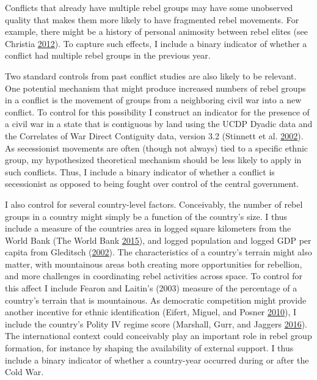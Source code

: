 \documentclass[12pt,]{book}
\theoremstyle{definition}
\theoremstyle{definition}
\theoremstyle{remark}
\begin{document}
Conflicts that already have multiple rebel groups may have some
unobserved quality that makes them more likely to have fragmented rebel
movements. For example, there might be a history of personal animosity
between rebel elites (see Christia
\protect\hyperlink{ref-Christia2012}{2012}). To capture such effects, I
include a binary indicator of whether a conflict had multiple rebel
groups in the previous year.

Two standard controls from past conflict studies are also likely to be
relevant. One potential mechanism that might produce increased numbers
of rebel groups in a conflict is the movement of groups from a
neighboring civil war into a new conflict. To control for this
possibility I construct an indicator for the presence of a civil war in
a state that is contiguous by land using the UCDP Dyadic data and the
Correlates of War Direct Contiguity data, version 3.2 (Stinnett et al.
\protect\hyperlink{ref-Stinnett2002a}{2002}). As secessionist movements
are often (though not always) tied to a specific ethnic group, my
hypothesized theoretical mechanism should be less likely to apply in
such conflicts. Thus, I include a binary indicator of whether a conflict
is secessionist as opposed to being fought over control of the central
government.

I also control for several country-level factors. Conceivably, the
number of rebel groups in a country might simply be a function of the
country's size. I thus include a measure of the countries area in logged
square kilometers from the World Bank (The World Bank
\protect\hyperlink{ref-WorldBank2015}{2015}), and logged population and
logged GDP per capita from Gleditsch
(\protect\hyperlink{ref-Gleditsch2002b}{2002}). The characteristics of a
country's terrain might also matter, with mountainous areas both
creating more opportunities for rebellion, and more challenges in
coordinating rebel activities across space. To control for this affect I
include Fearon and Laitin's (2003) measure of the percentage of a
country's terrain that is mountainous. As democratic competition might
provide another incentive for ethnic identification (Eifert, Miguel, and
Posner \protect\hyperlink{ref-Eifert2010}{2010}), I include the
country's Polity IV regime score (Marshall, Gurr, and Jaggers
\protect\hyperlink{ref-Marshall2016}{2016}). The international context
could conceivably play an important role in rebel group formation, for
instance by shaping the availability of external support. I thus include
a binary indicator of whether a country-year occurred during or after
the Cold War.
\end{document}
